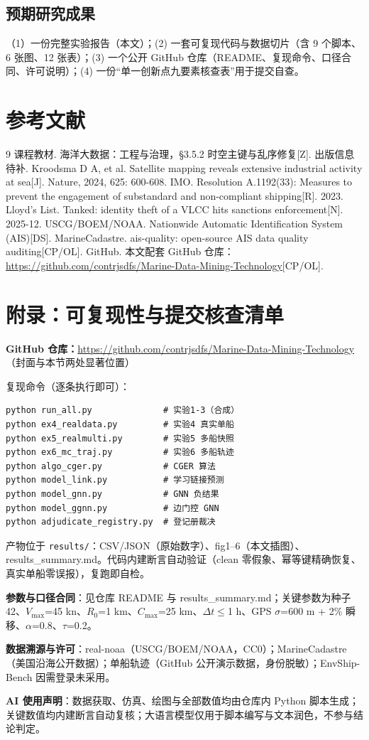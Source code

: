 \documentclass[10.5pt,a4paper]{ctexart}
\newcommand{\ghrepo}{https://github.com/contrjsdfs/Marine-Data-Mining-Technology}
\begin{document}
\subsection{预期研究成果}
（1）一份完整实验报告（本文）；(2) 一套可复现代码与数据切片（含 9 个脚本、6 张图、12 张表）；(3) 一个公开 GitHub 仓库（README、复现命令、口径合同、许可说明）；(4) 一份``单一创新点九要素核查表''用于提交自查。

\section{参考文献}
\begin{thebibliography}{9}\small
{} 课程教材. 海洋大数据：工程与治理，\S3.5.2 时空主键与乱序修复[Z]. 出版信息待补.
 Kroodsma D A, et al. Satellite mapping reveals extensive industrial activity at sea[J]. Nature, 2024, 625: 600-608.
 IMO. Resolution A.1192(33): Measures to prevent the engagement of substandard and non-compliant shipping[R]. 2023.
 Lloyd's List. Tanked: identity theft of a VLCC hits sanctions enforcement[N]. 2025-12.
 USCG/BOEM/NOAA. Nationwide Automatic Identification System (AIS)[DS]. MarineCadastre.
 ais-quality: open-source AIS data quality auditing[CP/OL]. GitHub.
 本文配套 GitHub 仓库：\url{\ghrepo}[CP/OL].
\end{thebibliography}

\newpage
\section*{附录：可复现性与提交核查清单}
\noindent\small\textbf{GitHub 仓库：}\url{\ghrepo}\normalsize\quad（封面与本节两处显著位置）

复现命令（逐条执行即可）：
\begin{verbatim}
python run_all.py              # 实验1-3（合成）
python ex4_realdata.py         # 实验4 真实单船
python ex5_realmulti.py        # 实验5 多船快照
python ex6_mc_traj.py          # 实验6 多船轨迹
python algo_cger.py            # CGER 算法
python model_link.py           # 学习链接预测
python model_gnn.py            # GNN 负结果
python model_ggnn.py           # 边门控 GNN
python adjudicate_registry.py  # 登记册裁决
\end{verbatim}
产物位于 \texttt{results/}：CSV/JSON（原始数字）、fig1--6（本文插图）、results\_summary.md。代码内建断言自动验证（clean 零假象、幂等键精确恢复、真实单船零误报），复跑即自检。

\noindent\textbf{参数与口径合同}：见仓库 README 与 results\_summary.md；关键参数为种子 42、$V_{\max}$=45 kn、$R_0$=1 km、$C_{\max}$=25 km、$\Delta t\le$1 h、GPS $\sigma$=600 m + 2\% 瞬移、$\alpha$=0.8、$\tau$=0.2。

\noindent\textbf{数据溯源与许可}：real-noaa（USCG/BOEM/NOAA，CC0）；MarineCadastre（美国沿海公开数据）；单船轨迹（GitHub 公开演示数据，身份脱敏）；EnvShip-Bench 因需登录未采用。

\noindent\textbf{AI 使用声明}：数据获取、仿真、绘图与全部数值均由仓库内 Python 脚本生成；关键数值均内建断言自动复核；大语言模型仅用于脚本编写与文本润色，不参与结论判定。
\end{document}
